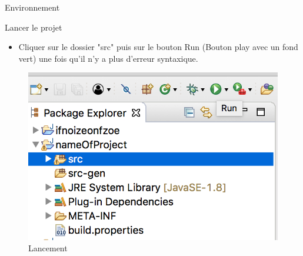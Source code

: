 \documentclass{bredelebeamer}
\begin{document}
\begin{frame}{Environnement}
\begin{block}{Lancer le projet}
\begin{itemize}
\item Cliquer sur le dossier "src" puis sur le bouton Run (Bouton play avec un fond vert) une fois qu'il n'y a plus d'erreur syntaxique.
\end{itemize}
\end{block}\pause
\begin{figure}
\centering
\includegraphics[scale=0.3]{images/09.png}
\caption{Lancement}
\end{figure}
\end{frame}
\end{document}
